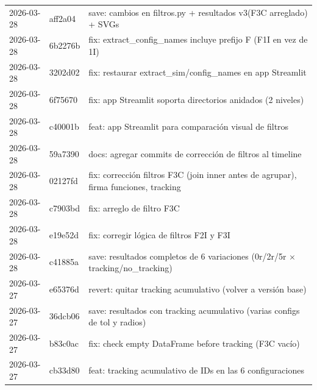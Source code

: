 \documentclass[12pt,a4paper]{article}
\begin{document}
\begin{longtable}{@{}llp{10cm}@{}}
	2026-03-28     & aff2a04         & save: cambios en filtros.py + resultados v3(F3C arreglado) + SVGs                                                     \\
	2026-03-28     & 6b2276b         & fix: extract\_config\_names incluye prefijo F (F1I en vez de 1I)                                                      \\
	2026-03-28     & 3202d02         & fix: restaurar extract\_sim/config\_names en app Streamlit                                                            \\
	2026-03-28     & 6f75670         & fix: app Streamlit soporta directorios anidados (2 niveles)                                                           \\
	2026-03-28     & c40001b         & feat: app Streamlit para comparación visual de filtros                                                                \\
	2026-03-28     & 59a7390         & docs: agregar commits de corrección de filtros al timeline                                                            \\
	2026-03-28     & 02127fd         & fix: corrección filtros F3C (join inner antes de agrupar), firma funciones, tracking                                  \\
	2026-03-28     & c7903bd         & fix: arreglo de filtro F3C                                                                                            \\
	2026-03-28     & e19e52d         & fix: corregir lógica de filtros F2I y F3I                                                                             \\
	2026-03-28     & c41885a         & save: resultados completos de 6 variaciones (0r/2r/5r $\times$ tracking/no\_tracking)                                 \\
	2026-03-27     & e65376d         & revert: quitar tracking acumulativo (volver a versión base)                                                           \\
	2026-03-27     & 36dcb06         & save: resultados con tracking acumulativo (varias configs de tol y radios)                                            \\
	2026-03-27     & b83c0ac         & fix: check empty DataFrame before tracking (F3C vacío)                                                                \\
	2026-03-27     & cb33d80         & feat: tracking acumulativo de IDs en las 6 configuraciones                                                            \\

\end{longtable}
\end{document}

